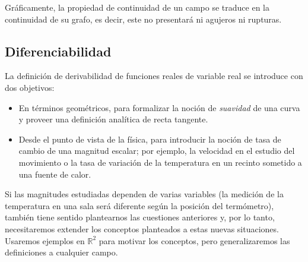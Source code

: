%
Gráficamente, la propiedad de continuidad de un campo se traduce en la continuidad de su grafo, es decir, este no presentará ni agujeros ni rupturas.

\subsection{Diferenciabilidad}

La definición de derivabilidad de funciones reales de variable real se introduce  con dos objetivos:
\begin{itemize}
\item
En términos geométricos, para formalizar la noción de \emph{suavidad} de una curva y proveer una definición analítica de recta tangente.
\item
Desde el punto de vista de la física, para introducir la noción de tasa de cambio de una magnitud escalar;
por ejemplo, la velocidad en el estudio del movimiento o la tasa de variación de la temperatura en un recinto sometido a una fuente de calor.
\end{itemize}
%
Si las magnitudes estudiadas dependen de varias variables (la medición de la temperatura en una sala será diferente según la posición del termómetro), también tiene sentido plantearnos las cuestiones anteriores y, por lo tanto, necesitaremos extender los conceptos planteados a estas nuevas situaciones.
Usaremos ejemplos en $\mathbb{R}^2$ para motivar los conceptos, pero generalizaremos las definiciones a cualquier campo.

